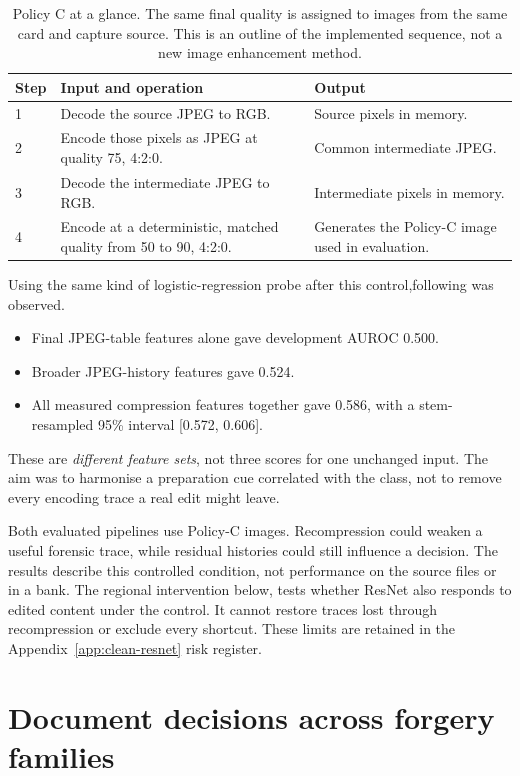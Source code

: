 \begin{table}[htbp]
\centering\small
\caption{Policy C at a glance. The same final quality is assigned to images from the same card and capture source. This is an outline of the implemented sequence, not a new image enhancement method.}
\label{tab:clean-policy-c}
\begin{tabularx}{\textwidth}{@{}lp{}X@{}}
\toprule
Step & Input and operation & Output \\
\midrule
1 & Decode the source JPEG to RGB. & Source pixels in memory. \\
2 & Encode those pixels as JPEG at quality 75, 4:2:0. & Common intermediate JPEG. \\
3 & Decode the intermediate JPEG to RGB. & Intermediate pixels in memory. \\
4 & Encode at a deterministic, matched quality from 50 to 90, 4:2:0. & Generates the Policy-C image used in evaluation. \\
\bottomrule
\end{tabularx}
\end{table}

Using the same kind of logistic-regression probe after this control,following was observed. 
\begin{itemize}
    \item Final JPEG-table features alone gave development AUROC 0.500.
    \item Broader JPEG-history features gave 0.524.
    \item All measured compression features together gave 0.586, with a stem-resampled 95\% interval [0.572, 0.606].
\end{itemize}
These are \emph{different feature sets}, not three scores for one unchanged input. The aim was to harmonise a preparation cue correlated with the class, not to remove every encoding trace a real edit might leave.

Both evaluated pipelines use Policy-C images. Recompression could weaken a useful forensic trace, while residual histories could still influence a decision. The results describe this controlled condition, not performance on the source files or in a bank. The regional intervention below, tests whether ResNet also responds to edited content under the control. It cannot restore traces lost through recompression or exclude every shortcut. These limits are retained in the Appendix~\ref{app:clean-resnet} risk register.

\section{Document decisions across forgery families}
\label{sec:clean-detection}

